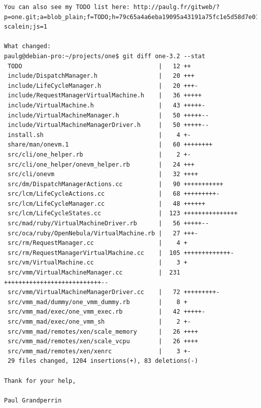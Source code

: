 \begin{lstlisting}
You can also see my TODO list here: http://paulg.fr/gitweb/?p=one.git;a=blob_plain;f=TODO;h=79c65a4a6eba19095a43191a75fc1e5d58d7e01a;hb=refs/heads/feature-scalein;js=1

What changed:
paulg@debian-pro:~/projects/one$ git diff one-3.2 --stat
 TODO                                      |   12 ++
 include/DispatchManager.h                 |   20 +++
 include/LifeCycleManager.h                |   20 +++-
 include/RequestManagerVirtualMachine.h    |   36 +++++
 include/VirtualMachine.h                  |   43 +++++-
 include/VirtualMachineManager.h           |   50 +++++--
 include/VirtualMachineManagerDriver.h     |   50 +++++--
 install.sh                                |    4 +-
 share/man/onevm.1                         |   60 ++++++++
 src/cli/one_helper.rb                     |    2 +-
 src/cli/one_helper/onevm_helper.rb        |   24 +++
 src/cli/onevm                             |   32 ++++
 src/dm/DispatchManagerActions.cc          |   90 +++++++++++
 src/lcm/LifeCycleActions.cc               |   68 +++++++++-
 src/lcm/LifeCycleManager.cc               |   48 ++++++
 src/lcm/LifeCycleStates.cc                |  123 +++++++++++++++
 src/mad/ruby/VirtualMachineDriver.rb      |   56 +++++--
 src/oca/ruby/OpenNebula/VirtualMachine.rb |   27 +++-
 src/rm/RequestManager.cc                  |    4 +
 src/rm/RequestManagerVirtualMachine.cc    |  105 +++++++++++++-
 src/vm/VirtualMachine.cc                  |    3 +
 src/vmm/VirtualMachineManager.cc          |  231 +++++++++++++++++++++++++++--
 src/vmm/VirtualMachineManagerDriver.cc    |   72 +++++++++-
 src/vmm_mad/dummy/one_vmm_dummy.rb        |    8 +
 src/vmm_mad/exec/one_vmm_exec.rb          |   42 +++++-
 src/vmm_mad/exec/one_vmm_sh               |    2 +-
 src/vmm_mad/remotes/xen/scale_memory      |   26 ++++
 src/vmm_mad/remotes/xen/scale_vcpu        |   26 ++++
 src/vmm_mad/remotes/xen/xenrc             |    3 +-
 29 files changed, 1204 insertions(+), 83 deletions(-)

Thank for your help,

Paul Grandperrin
\end{lstlisting}


